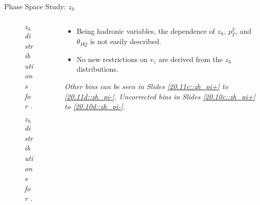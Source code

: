 \begin{frame}{Phase Space Study: $z_h$}
    \label{12.14::zh}

    \begin{columns}[onlytextwidth,T]

    \begin{column}{.44\linewidth}
        \vspace{-15pt}
        \begin{center}
            \begin{figure}[t]
                \scriptsize{\textit{$z_h$ distributions for \ef{$\pi^-$}.}}
            \end{figure}

            \vspace{-15pt}
            \begin{figure}[t]
                \scriptsize{\textit{$z_h$ distributions for \ef{$\pi^+$}.}}
            \end{figure}
        \end{center}
    \end{column}

    \begin{column}{.54\linewidth}
        \begin{itemize}
            \item
                Being hadronic variables, the \ef{$\theta$} dependence of $z_h$, $p_T^2$, and $\theta_{PQ}$ is not easily described.

            \vspace{12pt}
            \item
                No new restrictions on $v_z$ are derived from the $z_h$ distributions.

        \end{itemize}

        \vspace{114pt}

        \begin{flushright}
            \tiny{\textit{
                Other bins can be seen in Slides \textcolor{efd_purple}{\ref{20.11c::zh_pi+}} to \textcolor{efd_purple}{\ref{20.11d::zh_pi-}}.
                Uncorrected bins in Slides \textcolor{efd_purple}{\ref{20.10c::zh_pi+}} to \textcolor{efd_purple}{\ref{20.10d::zh_pi-}}.
            }}
        \end{flushright}
    \end{column}

    \end{columns}
\end{frame}

